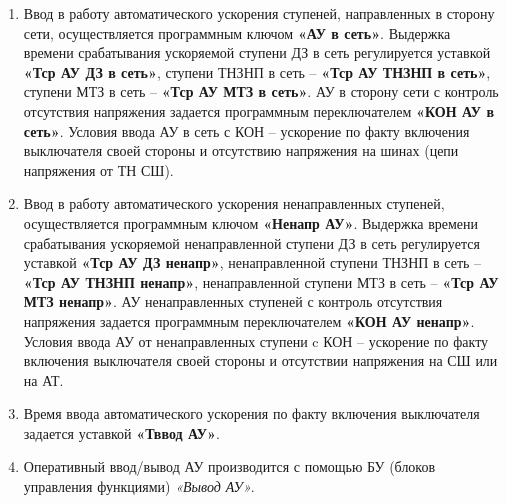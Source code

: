 \begin{enumerate}
\item
Ввод в работу автоматического ускорения ступеней, направленных в сторону сети, осуществляется программным ключом \textbf{«АУ в сеть»}. Выдержка времени срабатывания ускоряемой ступени ДЗ в сеть регулируется уставкой \textbf{«Тср АУ ДЗ в сеть»}, ступени ТНЗНП в сеть -- \textbf{«Тср АУ ТНЗНП в сеть»}, ступени МТЗ в сеть -- \textbf{«Тср АУ МТЗ в сеть»}. АУ в сторону сети с контроль отсутствия напряжения задается программным переключателем \textbf{«КОН АУ в сеть»}. Условия ввода АУ в сеть с КОН -- ускорение по факту включения выключателя своей стороны и отсутствию напряжения на шинах (цепи напряжения от ТН СШ).

\item
Ввод в работу автоматического ускорения ненаправленных ступеней, осуществляется программным ключом \textbf{«Ненапр АУ»}. Выдержка времени срабатывания ускоряемой ненаправленной ступени ДЗ в сеть регулируется уставкой \textbf{«Тср АУ ДЗ ненапр»}, ненаправленной ступени ТНЗНП в сеть -- \textbf{«Тср АУ ТНЗНП ненапр»}, ненаправленной ступени МТЗ в сеть -- \textbf{«Тср АУ МТЗ ненапр»}. АУ ненаправленных ступеней с
контроль отсутствия напряжения задается программным переключателем \textbf{«КОН АУ ненапр»}. Условия ввода АУ от ненаправленных ступени c КОН -- ускорение по факту включения выключателя своей стороны и отсутствии напряжения на СШ или на АТ.

\item
Время ввода автоматического ускорения по факту включения выключателя задается уставкой \textbf{«Тввод АУ»}.

\item
Оперативный ввод/вывод АУ производится с помощью БУ (блоков управления функциями) \textit{«Вывод АУ»}.

\end{enumerate}
